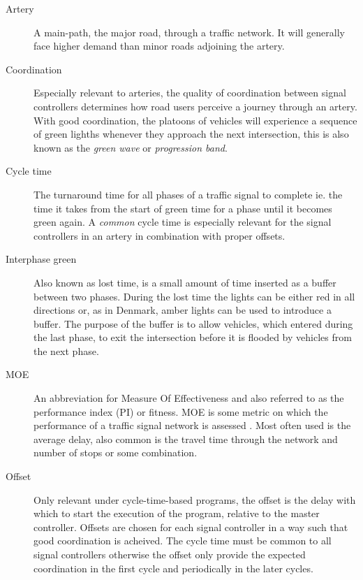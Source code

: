 \begin{description}

\item[Artery] A main-path, the major road, through a traffic network. It will generally face higher demand than minor roads adjoining the artery.
			
\item[Coordination] Especially relevant to arteries, the quality of coordination between signal controllers determines how road users perceive a journey through an artery. With good coordination, the platoons of vehicles will experience a sequence of green lighths whenever they approach the next intersection, this is also known as the \textit{green wave} or \textit{progression band}.
			
\item[Cycle time] The turnaround time for all phases of a traffic signal to complete ie. the time it takes from the start of green time for a phase until it becomes green again. A \textit{common} cycle time is especially relevant for the signal controllers in an artery in combination with proper offsets.

\item[Interphase green] Also known as lost time, is a small amount of time inserted as a buffer between two phases. During the lost time the lights can be either red in all directions or, as in Denmark, amber lights can be used to introduce a buffer. The purpose of the buffer is to allow vehicles, which entered during the last phase, to exit the intersection before it is flooded by vehicles from the next phase.

\item[MOE] An abbreviation for Measure Of Effectiveness and also referred to as the performance index (PI) or fitness. MOE is some metric on which the performance of a traffic signal network is assessed .
	Most often used is the average delay, also common is the travel time through the network and number of stops or some combination.
	
\item[Offset] Only relevant under cycle-time-based programs, the offset is the delay with which to start the execution of the program, relative to the master controller. Offsets are chosen for each signal controller in a way such that good coordination is acheived. The cycle time must be common to all signal controllers otherwise the offset only provide the expected coordination in the first cycle and periodically in the later cycles.
	

\end{description}
